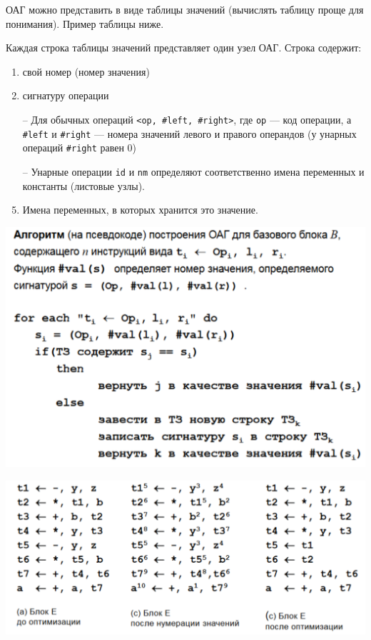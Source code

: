 ОАГ можно представить в виде таблицы значений (вычислять таблицу проще для понимания). Пример таблицы ниже.

Каждая строка таблицы значений представляет один узел ОАГ. Строка содержит: 
\begin{enumerate}
    \item свой номер (номер значения)
    \item сигнатуру операции 
        \item[--] Для обычных операций \texttt{<op, \#left, \#right>}, где \texttt{ор} –-- код операции, а \texttt{\#left} и \texttt{\#right} --- номера значений левого и правого операндов (у унарных операций \texttt{\#right} равен 0)
        \item[--] Унарные операции \texttt{id} и \texttt{nm} определяют соответственно имена переменных и константы (листовые узлы). 
    \item Имена переменных, в которых хранится это значение.
\end{enumerate}

\includegraphics[width=\columnwidth]{pics/oag_alg.png}

\includegraphics[width=\columnwidth]{pics/blocks.png}

